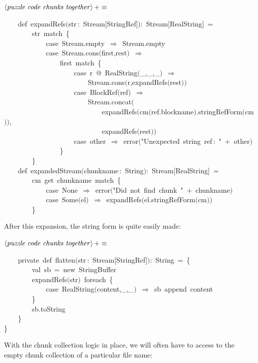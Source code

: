 \documentclass[a4paper,12pt]{article}
\begin{document}
$\left<\mbox{\emph{puzzle code chunks together}}\right>+\equiv$
\begin{program}~~~~{\vem def}~expandRefs$($str\,{\rm :}~Stream$[$StringRef$]$$)${\rm :}~Stream$[$RealString$]$~=
\\~~~~~~~~str~{\vem match}~{\small\{}
\\~~~~~~~~~~~~{\vem case}~Stream.empty~$\Rightarrow$~Stream.empty
\\~~~~~~~~~~~~{\vem case}~Stream.cons$($first,rest$)$~$\Rightarrow$
\\~~~~~~~~~~~~~~~~first~{\vem match}~{\small\{}
\\~~~~~~~~~~~~~~~~~~~~{\vem case}~r~@~RealString$($\_,\_,\_$)$~$\Rightarrow$
\\~~~~~~~~~~~~~~~~~~~~~~~~Stream.cons$($r,expandRefs$($rest$)$$)$
\\~~~~~~~~~~~~~~~~~~~~{\vem case}~BlockRef$($ref$)$~$\Rightarrow$
\\~~~~~~~~~~~~~~~~~~~~~~~~Stream.concat$($
\\~~~~~~~~~~~~~~~~~~~~~~~~~~~~expandRefs$($cm$($ref.blockname$)$.stringRefForm$($cm$)$$)$,
\\~~~~~~~~~~~~~~~~~~~~~~~~~~~~expandRefs$($rest$)$$)$
\\~~~~~~~~~~~~~~~~~~~~{\vem case}~other~$\Rightarrow$~error$($"Unexpected~string~ref\,{\rm :}~"~$+$~other$)$
\\~~~~~~~~~~~~~~~~{\small\}}
\\~~~~~~~~{\small\}}
\\[0.5em]~~~~{\vem def}~expandedStream$($chunkname\,{\rm :}~String$)${\rm :}~Stream$[$RealString$]$~=
\\~~~~~~~~cm~get~chunkname~{\vem match}~{\small\{}
\\~~~~~~~~~~~~{\vem case}~None~$\Rightarrow$~error$($"Did~not~find~chunk~"~$+$~chunkname$)$
\\~~~~~~~~~~~~{\vem case}~Some$($el$)$~$\Rightarrow$~expandRefs$($el.stringRefForm$($cm$)$$)$
\\~~~~~~~~{\small\}}
\\[0.5em]\end{program}
After this expansion, the string form is quite easily made:

$\left<\mbox{\emph{puzzle code chunks together}}\right>+\equiv$
\begin{program}~~~~{\vem private}~{\vem def}~flatten$($str\,{\rm :}~Stream$[$StringRef$]$$)${\rm :}~String~=~{\small\{}
\\~~~~~~~~{\vem val}~sb~=~{\vem new}~StringBuffer
\\~~~~~~~~expandRefs$($str$)$~foreach~{\small\{}
\\~~~~~~~~~~~~{\vem case}~RealString$($content,\_,\_$)$~$\Rightarrow$~sb~append~content
\\~~~~~~~~{\small\}}
\\~~~~~~~~sb.toString
\\~~~~{\small\}}
\\{\small\}}
\\[0.5em]\end{program}
With the chunk collection logic in place, we will often have to access
to the empty chunk collection of a particular file name:
\end{document}
